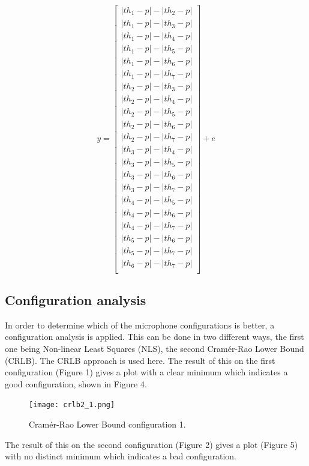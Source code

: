 \documentclass[11pt]{article}
\begin{document}
\[
  y = 
  \begin{bmatrix}
    |th_1 - p| - |th_2 - p| \\
    |th_1 - p| - |th_3 - p| \\
    |th_1 - p| - |th_4 - p| \\
    |th_1 - p| - |th_5 - p| \\
    |th_1 - p| - |th_6 - p| \\
    |th_1 - p| - |th_7 - p| \\
    |th_2 - p| - |th_3 - p| \\
    |th_2 - p| - |th_4 - p| \\
    |th_2 - p| - |th_5 - p| \\
    |th_2 - p| - |th_6 - p| \\
    |th_2 - p| - |th_7 - p| \\
    |th_3 - p| - |th_4 - p| \\
    |th_3 - p| - |th_5 - p| \\
    |th_3 - p| - |th_6 - p| \\
    |th_3 - p| - |th_7 - p| \\
    |th_4 - p| - |th_5 - p| \\
    |th_4 - p| - |th_6 - p| \\
    |th_4 - p| - |th_7 - p| \\
    |th_5 - p| - |th_6 - p| \\
    |th_5 - p| - |th_7 - p| \\
    |th_6 - p| - |th_7 - p| \\
  \end{bmatrix} + e
\]

\subsection{Configuration analysis}
In order to determine which of the microphone configurations is better, a configuration analysis is applied. This can be done in two different ways, the first one being Non-linear Least Squares (NLS), the second Cramér-Rao Lower Bound (CRLB). The CRLB approach is used here. The result of this on the first configuration (Figure 1) gives a plot with a clear minimum which indicates a good configuration, shown in Figure 4.\\
\begin{figure}
\begin{center}
  \texttt{[image: crlb2\_1.png]}
  \caption{Cramér-Rao Lower Bound configuration 1.}
  \end{center}
\end{figure}
The result of this on the second configuration (Figure 2) gives a plot (Figure 5) with no distinct minimum which indicates a bad configuration. 
\end{document}
